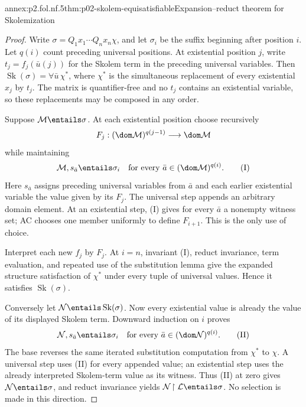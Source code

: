 \begin{annexitem}{annex:p2.fol.nf.5}{thm:p02-skolem-equisatisfiable}{Expansion--reduct theorem for Skolemization}
\begin{proof}
Write \(\sigma=Q_1x_1\cdots Q_nx_n\chi\), and let \(\sigma_i\) be the
suffix beginning after position \(i\).  Let \(q(i)\) count preceding
universal positions.  At existential position \(j\), write
\(t_j=f_j(\bar u(j))\) for the Skolem term in the preceding universal
variables.  Then
\(\operatorname{Sk}(\sigma)=\forall\bar u\,\chi^*\), where
\(\chi^*\) is the simultaneous replacement of every existential
\(x_j\) by \(t_j\).  The matrix is quantifier-free and no \(t_j\) contains
an existential variable, so these replacements may be composed in any
order.

Suppose \(\mathcal M\entails\sigma\).  At each existential position choose
recursively
\[
 F_j:(\dom\mathcal M)^{q(j-1)}\longrightarrow\dom\mathcal M
\]
while maintaining
\[
 \mathcal M,s_{\bar a}\entails\sigma_i
 \quad\text{for every }\bar a\in(\dom\mathcal M)^{q(i)}. \tag{I}
\]
Here \(s_{\bar a}\) assigns preceding universal variables from \(\bar a\)
and each earlier existential variable the value given by its \(F_j\).
The universal step appends an arbitrary domain element.  At an existential
step, (I) gives for every \(\bar a\) a nonempty witness set; AC chooses one
member uniformly to define \(F_{i+1}\).  This is the only use of choice.

Interpret each new \(f_j\) by \(F_j\).  At \(i=n\), invariant (I), reduct
invariance, term evaluation, and repeated use of the substitution lemma give
the expanded structure satisfaction of \(\chi^*\) under every tuple of
universal values.  Hence it satisfies \(\operatorname{Sk}(\sigma)\).

Conversely let \(\mathcal N\entails\operatorname{Sk}(\sigma)\).  Now every
existential value is already the value of its displayed Skolem term.  Downward
induction on \(i\) proves
\[
 \mathcal N,s_{\bar a}\entails\sigma_i
 \quad\text{for every }\bar a\in(\dom\mathcal N)^{q(i)}. \tag{II}
\]
The base reverses the same iterated substitution computation from
\(\chi^*\) to \(\chi\).  A universal step uses (II) for every appended
value; an existential step uses the already interpreted Skolem-term value as
its witness.  Thus (II) at zero gives \(\mathcal N\entails\sigma\), and
reduct invariance yields
\(\mathcal N\!\upharpoonright\mathcal L\entails\sigma\).  No selection is
made in this direction.
\end{proof}
\end{annexitem}
